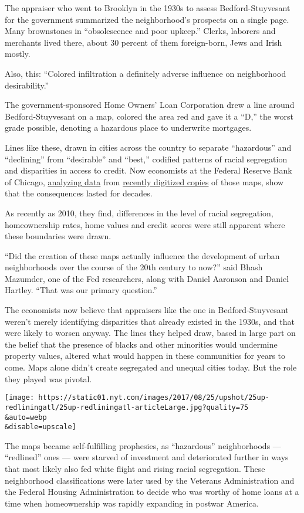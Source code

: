 The appraiser who went to Brooklyn in the 1930s to assess
Bedford-Stuyvesant for the government summarized the neighborhood's
prospects on a single page. Many brownstones in ``obsolescence and poor
upkeep.'' Clerks, laborers and merchants lived there, about 30 percent
of them foreign-born, Jews and Irish mostly.

Also, this: ``Colored infiltration a definitely adverse influence on
neighborhood desirability.''

The government-sponsored Home Owners' Loan Corporation drew a line
around Bedford-Stuyvesant on a map, colored the area red and gave it a
``D,'' the worst grade possible, denoting a hazardous place to
underwrite mortgages.

Lines like these, drawn in cities across the country to separate
``hazardous'' and ``declining'' from ``desirable'' and ``best,''
codified patterns of racial segregation and disparities in access to
credit. Now economists at the Federal Reserve Bank of Chicago,
\href{https://www.chicagofed.org/publications/working-papers/2017/wp2017-12}{analyzing
data} from \href{https://dsl.richmond.edu/panorama/redlining/}{recently
digitized copies} of those maps, show that the consequences lasted for
decades.

As recently as 2010, they find, differences in the level of racial
segregation, homeownership rates, home values and credit scores were
still apparent where these boundaries were drawn.

``Did the creation of these maps actually influence the development of
urban neighborhoods over the course of the 20th century to now?'' said
Bhash Mazumder, one of the Fed researchers, along with Daniel Aaronson
and Daniel Hartley. ``That was our primary question.''

The economists now believe that appraisers like the one in
Bedford-Stuyvesant weren't merely identifying disparities that already
existed in the 1930s, and that were likely to worsen anyway. The lines
they helped draw, based in large part on the belief that the presence of
blacks and other minorities would undermine property values, altered
what would happen in these communities for years to come. Maps alone
didn't create segregated and unequal cities today. But the role they
played was pivotal.

\texttt{[image: https://static01.nyt.com/images/2017/08/25/upshot/25up-redliningatl/25up-redliningatl-articleLarge.jpg?quality=75\\\&auto=webp\\\&disable=upscale]}

The maps became self-fulfilling prophesies, as ``hazardous''
neighborhoods --- ``redlined'' ones --- were starved of investment and
deteriorated further in ways that most likely also fed white flight and
rising racial segregation. These neighborhood classifications were later
used by the Veterans Administration and the Federal Housing
Administration to decide who was worthy of home loans at a time when
homeownership was rapidly expanding in postwar America.

